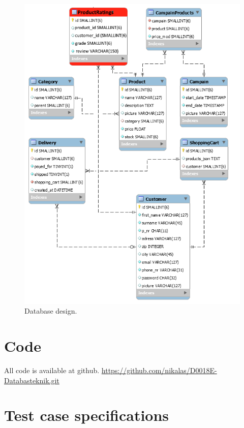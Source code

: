 \documentclass[paper=a4, fontsize=11pt]{report} %
\begin{document}
\begin{itemize}
\begin{figure}
	\includegraphics[width=\textwidth]{artifacts/db_implemented_1_3.png}
	\caption{Database design.}
	\label{fig:db}
\end{figure}

\section*{Code}
All code is available at github.
\url{https://github.com/nikalas/D0018E-Databasteknik.git}

\section*{Test case specifications}



\end{itemize}
\end{document}
